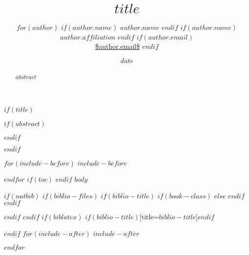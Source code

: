 \documentclass[fancyhdr,fntef,UTF8]{ctexart}
\title{$title$}
\author{
$for(author)$
$if(author.name)$
\Large $author.name$\vspace{0.05in}
$endif$
$if(author.name)$
\\ \normalsize\emph{$author.affiliation$} 
$endif$
$if(author.email)$
\\ \footnotesize \url{$author.email$}\vspace*{0.2in}
$endif$
}
\date{$date$}
\begin{document}
$if(title)$
\maketitle

$if(abstract)$
\begin{abstract}
\noindent $abstract$
\end{abstract}
$endif$

\newpage
$endif$

$for(include-before)$
$include-before$

$endfor$
$if(toc)$
{
\hypersetup{linkcolor=blue}
\tableofcontents
\newpage
}
$endif$
$body$

$if(natbib)$
$if(biblio-files)$
$if(biblio-title)$
$if(book-class)$
\renewcommand\bibname{$biblio-title$}
$else$
\renewcommand\refname{$biblio-title$}
$endif$
$endif$


$endif$
$endif$
$if(biblatex)$
\printbibliography$if(biblio-title)$[title=$biblio-title$]$endif$

$endif$
$for(include-after)$
$include-after$

$endfor$
\end{document}
